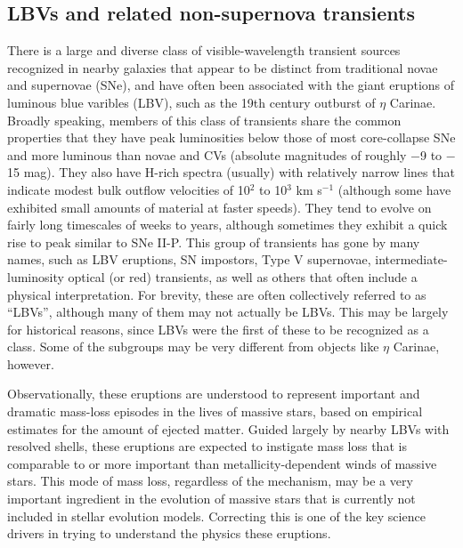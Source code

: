 %
%

\subsection{LBVs and related non-supernova transients}
\def\secname{\chpname:LBVs}\label{sec:\secname}


There is a large and diverse class of visible-wavelength transient
sources recognized in nearby galaxies that appear to be distinct from
traditional novae and supernovae (SNe), and have often been associated with
the giant eruptions of luminous blue varibles (LBV), such as the 19th
century outburst of $\eta$ Carinae.  Broadly speaking, members of this
class of transients share the common properties that they have peak
luminosities below those of most core-collapse SNe and more luminous
than novae and CVs (absolute magnitudes of roughly $-$9 to $-$15 mag).
They also have H-rich spectra (usually) with relatively narrow lines
that indicate modest bulk outflow velocities of 10$^2$ to 10$^3$ km
s$^{-1}$ (although some have exhibited small amounts of material at
faster speeds).  They tend to evolve on fairly long timescales of
weeks to years, although sometimes they exhibit a quick rise to peak
similar to SNe II-P. This group of transients has gone by many names,
such as LBV eruptions, SN impostors, Type V supernovae,
intermediate-luminosity optical (or red) transients, as well as others
that often include a physical interpretation.  For brevity, these are
often collectively referred to as ``LBVs'', although many of them may
not actually be LBVs. This may be largely for historical reasons,
since LBVs were the first of these to be recognized as a class.  Some
of the subgroups may be very different from objects like $\eta$
Carinae, however.

Observationally, these eruptions are understood to represent important
and dramatic mass-loss episodes in the lives of massive stars, based
on empirical estimates for the amount of ejected matter.  Guided
largely by nearby LBVs with resolved shells, these eruptions are
expected to instigate mass loss that is comparable to or more
important than metallicity-dependent winds of massive stars.  This
mode of mass loss, regardless of the mechanism, may be a very
important ingredient in the evolution of massive stars that is
currently not included in stellar evolution models.  Correcting this
is one of the key science drivers in trying to understand the physics
these eruptions.

